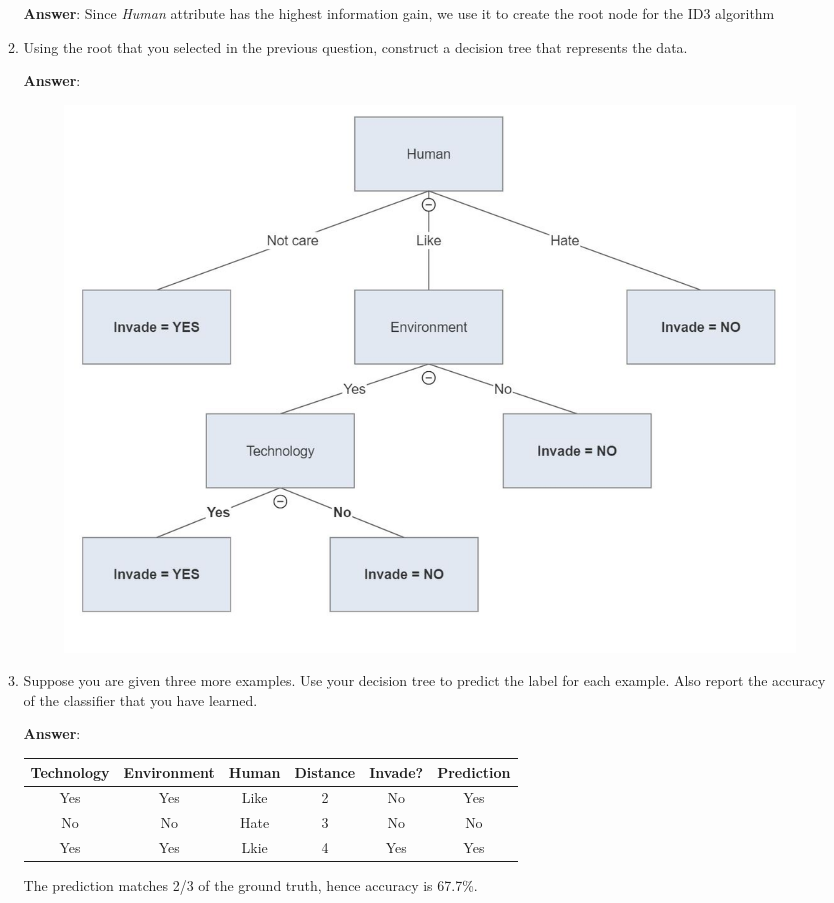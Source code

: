 \documentclass{article}
\begin{document}
\begin{enumerate}
\begin{enumerate}
    \textbf{Answer}: Since {\em Human} attribute has the highest information gain, we use it to create the root node for the ID3 algorithm
    
    \item Using the root that you selected in the previous question, construct a decision tree that represents the data.
    
    \textbf{Answer}:
    
    \begin{figure}[H]
        \centering
        \includegraphics{figures/dec_tree_2_e.jpg}
    \end{figure}
    
    \item Suppose you are given three more examples. Use your decision tree to predict the label for each example. Also report the accuracy of the classifier that you have learned.
    
    \textbf{Answer}: 
    \begin{table}[h]
        \centering
        \begin{tabular}{cccc|c|c}
        \hline
        Technology & Environment & Human & Distance & Invade? & Prediction \\ \hline
        Yes        & Yes         & Like  & 2        & No      &  Yes \\
        No         & No          & Hate  & 3        & No      &  No  \\
        Yes        & Yes         & Lkie  & 4        & Yes     &  Yes \\ \hline
        \end{tabular}
    \end{table}
    The prediction matches 2/3 of the ground truth, hence accuracy is 67.7\%.
\end{enumerate}


\end{enumerate}
\end{document}
